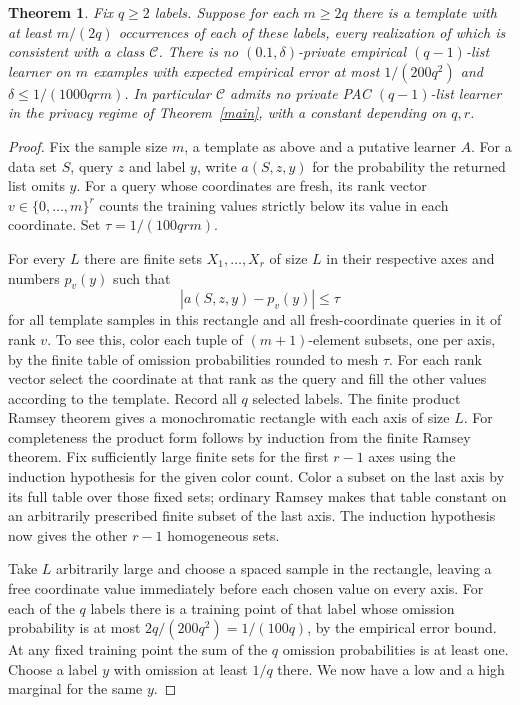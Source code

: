 \documentclass[11pt]{article}
\newtheorem{theorem}{Theorem}
\begin{document}
\begin{theorem}\label{template}
Fix $q\ge2$ labels. Suppose for each $m\ge2q$ there is a template with at least $m/(2q)$ occurrences of each of these labels, every realization of which is consistent with a class $\mathcal C$. There is no $(0.1,\delta)$-private empirical $(q-1)$-list learner on $m$ examples with expected empirical error at most $1/(200q^2)$ and $\delta\le1/(1000qrm)$. In particular $\mathcal C$ admits no private PAC $(q-1)$-list learner in the privacy regime of Theorem~\ref{main}, with a constant depending on $q,r$.
\end{theorem}

\begin{proof}
Fix the sample size $m$, a template as above and a putative learner $A$. For a data set $S$, query $z$ and label $y$, write $a(S,z,y)$ for the probability the returned list omits $y$. For a query whose coordinates are fresh, its rank vector $v\in\{0,\ldots,m\}^r$ counts the training values strictly below its value in each coordinate. Set $\tau=1/(100qrm)$.

For every $L$ there are finite sets $X_1,\ldots,X_r$ of size $L$ in their respective axes and numbers $p_v(y)$ such that
\[
 |a(S,z,y)-p_v(y)|\le\tau
\]
for all template samples in this rectangle and all fresh-coordinate queries in it of rank $v$. To see this, color each tuple of $(m+1)$-element subsets, one per axis, by the finite table of omission probabilities rounded to mesh $\tau$. For each rank vector select the coordinate at that rank as the query and fill the other values according to the template. Record all $q$ selected labels. The finite product Ramsey theorem gives a monochromatic rectangle with each axis of size $L$. For completeness the product form follows by induction from the finite Ramsey theorem. Fix sufficiently large finite sets for the first $r-1$ axes using the induction hypothesis for the given color count. Color a subset on the last axis by its full table over those fixed sets; ordinary Ramsey makes that table constant on an arbitrarily prescribed finite subset of the last axis. The induction hypothesis now gives the other $r-1$ homogeneous sets.

Take $L$ arbitrarily large and choose a spaced sample in the rectangle, leaving a free coordinate value immediately before each chosen value on every axis. For each of the $q$ labels there is a training point of that label whose omission probability is at most $2q/(200q^2)=1/(100q)$, by the empirical error bound. At any fixed training point the sum of the $q$ omission probabilities is at least one. Choose a label $y$ with omission at least $1/q$ there. We now have a low and a high marginal for the same $y$.


\end{proof}
\end{document}
